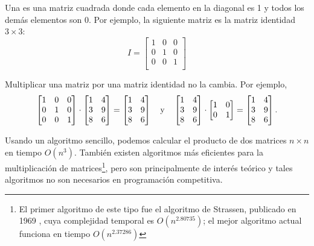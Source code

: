 
Una  es una matriz cuadrada
donde cada elemento en la diagonal es 1
y todos los demás elementos son 0.
Por ejemplo, la siguiente matriz
es la matriz identidad $3 \times 3$:
\[
 I = \begin{bmatrix}
  1 & 0 & 0 \\
  0 & 1 & 0 \\
  0 & 0 & 1 \\
 \end{bmatrix}
\]

\begin{samepage}
Multiplicar una matriz por una matriz identidad
no la cambia. Por ejemplo,
\[
 \begin{bmatrix}
  1 & 0 & 0 \\
  0 & 1 & 0 \\
  0 & 0 & 1 \\
 \end{bmatrix}
\cdot
 \begin{bmatrix}
  1 & 4 \\
  3 & 9 \\
  8 & 6 \\
 \end{bmatrix}
=
 \begin{bmatrix}
  1 & 4 \\
  3 & 9 \\
  8 & 6 \\
 \end{bmatrix} \hspace{10px} \textrm{y} \hspace{10px}
 \begin{bmatrix}
  1 & 4 \\
  3 & 9 \\
  8 & 6 \\
 \end{bmatrix}
\cdot
 \begin{bmatrix}
  1 & 0 \\
  0 & 1 \\
 \end{bmatrix}
=
 \begin{bmatrix}
  1 & 4 \\
  3 & 9 \\
  8 & 6 \\
 \end{bmatrix}.
\]
\end{samepage}

Usando un algoritmo sencillo,
podemos calcular el producto de
dos matrices $n \times n$
en tiempo $O(n^3)$.
También existen algoritmos más eficientes
para la multiplicación de matrices\footnote{El primer algoritmo de este tipo
fue el algoritmo de Strassen,
publicado en 1969 \cite{str69},
cuya complejidad temporal es $O(n^{2.80735})$;
el mejor algoritmo actual \cite{gal14}
funciona en tiempo $O(n^{2.37286})$},
pero son principalmente de interés teórico
y tales algoritmos no son necesarios
en programación competitiva.


